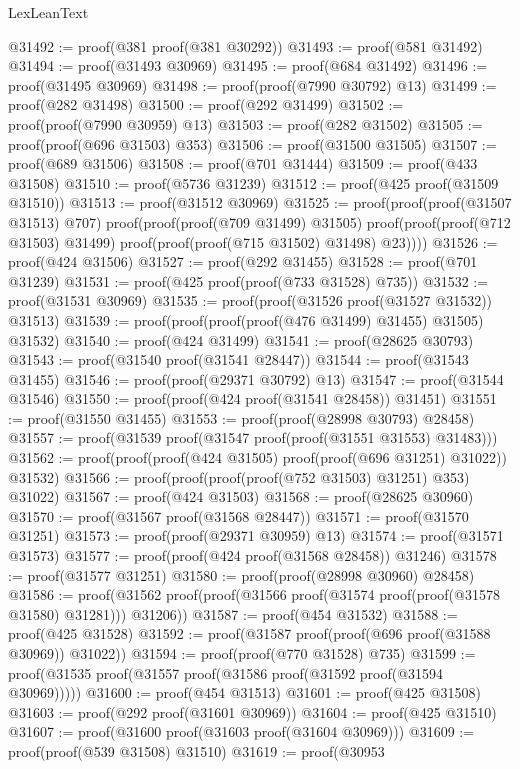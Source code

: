 \begin{lexlean}{LexLeanText}
\begin{coremodule}
@31492 := proof(@381 proof(@381 @30292))
@31493 := proof(@581 @31492)
@31494 := proof(@31493 @30969)
@31495 := proof(@684 @31492)
@31496 := proof(@31495 @30969)
@31498 := proof(proof(@7990 @30792) @13)
@31499 := proof(@282 @31498)
@31500 := proof(@292 @31499)
@31502 := proof(proof(@7990 @30959) @13)
@31503 := proof(@282 @31502)
@31505 := proof(proof(@696 @31503) @353)
@31506 := proof(@31500 @31505)
@31507 := proof(@689 @31506)
@31508 := proof(@701 @31444)
@31509 := proof(@433 @31508)
@31510 := proof(@5736 @31239)
@31512 := proof(@425 proof(@31509 @31510))
@31513 := proof(@31512 @30969)
@31525 := proof(proof(proof(@31507 @31513) @707)
      proof(proof(proof(@709 @31499) @31505)
          proof(proof(proof(@712 @31503) @31499) proof(proof(proof(@715 @31502) @31498) @23))))
@31526 := proof(@424 @31506)
@31527 := proof(@292 @31455)
@31528 := proof(@701 @31239)
@31531 := proof(@425 proof(proof(@733 @31528) @735))
@31532 := proof(@31531 @30969)
@31535 := proof(proof(@31526 proof(@31527 @31532)) @31513)
@31539 := proof(proof(proof(proof(@476 @31499) @31455) @31505) @31532)
@31540 := proof(@424 @31499)
@31541 := proof(@28625 @30793)
@31543 := proof(@31540 proof(@31541 @28447))
@31544 := proof(@31543 @31455)
@31546 := proof(proof(@29371 @30792) @13)
@31547 := proof(@31544 @31546)
@31550 := proof(proof(@424 proof(@31541 @28458)) @31451)
@31551 := proof(@31550 @31455)
@31553 := proof(proof(@28998 @30793) @28458)
@31557 := proof(@31539 proof(@31547 proof(proof(@31551 @31553) @31483)))
@31562 := proof(proof(proof(@424 @31505) proof(proof(@696 @31251) @31022)) @31532)
@31566 := proof(proof(proof(proof(@752 @31503) @31251) @353) @31022)
@31567 := proof(@424 @31503)
@31568 := proof(@28625 @30960)
@31570 := proof(@31567 proof(@31568 @28447))
@31571 := proof(@31570 @31251)
@31573 := proof(proof(@29371 @30959) @13)
@31574 := proof(@31571 @31573)
@31577 := proof(proof(@424 proof(@31568 @28458)) @31246)
@31578 := proof(@31577 @31251)
@31580 := proof(proof(@28998 @30960) @28458)
@31586 := proof(@31562 proof(proof(@31566 proof(@31574 proof(proof(@31578 @31580) @31281))) @31206))
@31587 := proof(@454 @31532)
@31588 := proof(@425 @31528)
@31592 := proof(@31587 proof(proof(@696 proof(@31588 @30969)) @31022))
@31594 := proof(proof(@770 @31528) @735)
@31599 := proof(@31535 proof(@31557 proof(@31586 proof(@31592 proof(@31594 @30969)))))
@31600 := proof(@454 @31513)
@31601 := proof(@425 @31508)
@31603 := proof(@292 proof(@31601 @30969))
@31604 := proof(@425 @31510)
@31607 := proof(@31600 proof(@31603 proof(@31604 @30969)))
@31609 := proof(proof(@539 @31508) @31510)
@31619 := proof(@30953

\end{coremodule}
\end{lexlean}
